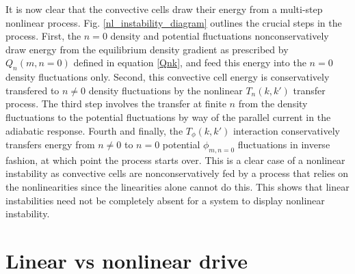 \documentclass[12pt]{article}
\begin{document}
It is now clear that the convective cells draw their energy from a multi-step nonlinear process. Fig. \ref{nl_instability_diagram} outlines the crucial steps in the process. 
First, the $n=0$ density and potential fluctuations nonconservatively draw energy from the equilibrium density gradient as prescribed by $Q_n(m,n=0)$ defined in equation \ref{Qnk}, and feed
this energy into the $n=0$ density fluctuations only. Second, this
convective cell energy is conservatively transfered to $n \ne 0$ density fluctuations by the nonlinear $T_n(k,k')$ transfer process. The third step involves the transfer at finite $n$ from the density
fluctuations to the potential fluctuations by way of the parallel current in the adiabatic response. Fourth and finally, the $T_\phi(k,k')$ interaction conservatively transfers energy from
$n \ne 0$ to $n=0$ potential $\phi_{m,n=0}$ fluctuations in inverse fashion, at which point the process starts over. This is a clear case of a nonlinear instability as convective cells
are nonconservatively fed by a process that relies on the nonlinearities since the linearities alone cannot do this. This shows that linear instabilities need not be completely absent 
for a system to display nonlinear instability. \\


\section{Linear vs nonlinear drive}


%
%
%
\end{document}
